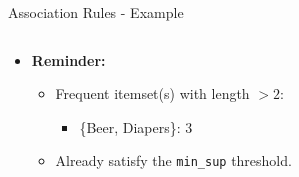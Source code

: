 \begin{frame}{Association Rules - Example}
\begin{columns}
\begin{column}{0.5\textwidth}
\begin{itemize}
				\item \textbf{Reminder:}
				      \begin{itemize}
					      \item Frequent itemset(s) with length $>2$:
					            \begin{itemize}
						            \item \{Beer, Diapers\}: $3$
					            \end{itemize}
					      \item Already satisfy the \texttt{min\_sup} threshold.
				      \end{itemize}
			\end{itemize}
		\end{column}
	\end{columns}
\end{frame}

